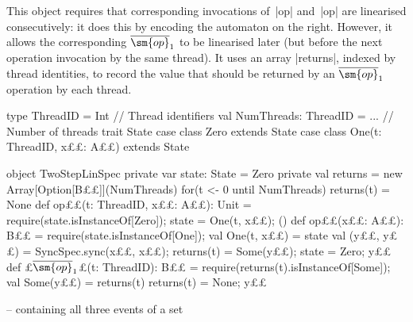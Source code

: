 This object requires that corresponding invocations of~|op| and~|op| are
linearised consecutively: it does this by encoding the automaton on the right.
However, it allows the corresponding $\overline{\sm{op}}_1$ to be linearised
later (but before the next operation invocation by the same thread).  It uses
an array |returns|, indexed by thread identities, to record the value that should
be returned by an $\overline{\sm{op}}_1$ operation by each thread.
%
\begin{trivlist}
\item[]
\begin{minipage}{92mm}
\begin{scala}
type ThreadID = Int               // Thread identifiers
val NumThreads: ThreadID = ... // Number of threads
trait State
case class Zero extends State
case class One(t: ThreadID, x££: A££) extends State
\end{scala}
\end{minipage}
\hfill 
%
\begin{minipage}{37.8mm}
%
\end{minipage}%
\begin{scala}
object TwoStepLinSpec{
  private var state: State = Zero
  private val returns = new Array[Option[B££]](NumThreads)
  for(t <- 0 until NumThreads) returns(t) = None
  def op££(t: ThreadID, x££: A££): Unit = {
    require(state.isInstanceOf[Zero]); state = One(t, x££); ()
  }
  def op££(x££: A££): B££ = {
    require(state.isInstanceOf[One]); val One(t, x££) = state
    val (y££, y££) = SyncSpec.sync(x££, x££); returns(t) = Some(y££); state = Zero; y££
  }
  def £$\overline{\sm{op}}_1$£(t: ThreadID): B££ = {
    require(returns(t).isInstanceOf[Some]); val Some(y££) = returns(t)
    returns(t) = None; y££
  }
}
\end{scala}
\end{trivlist}


 -- containing all three events of a set

